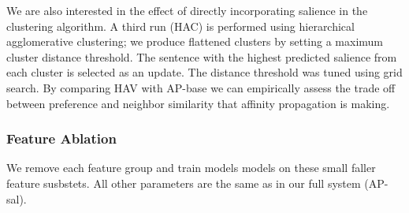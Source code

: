 We are also interested
in the effect of directly incorporating salience in the clustering algorithm.
A third run (HAC) is performed using hierarchical agglomerative 
clustering; we produce flattened clusters by setting a maximum cluster 
distance threshold. The sentence with the highest predicted salience from each
 cluster is selected as an update. 
The distance threshold was tuned using grid search. By comparing
HAV with AP-base we can empirically assess the trade off between preference
and neighbor similarity that affinity propagation is making.

\subsubsection{Feature Ablation}

We remove each feature group and train models models on these small faller 
feature susbstets. All other parameters are the same as in our full system 
(AP-sal).



